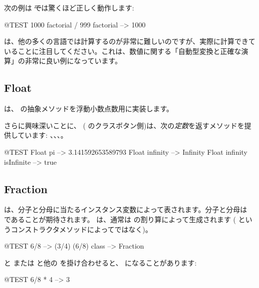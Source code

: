 \documentclass[a4paper,10pt,twoside]{book}
\begin{document}
次の例は \st では驚くほど正しく動作します:
\begin{code}{@TEST}
1000 factorial / 999 factorial --> 1000
\end{code}
 は、他の多くの言語では計算するのが非常に難しいのですが、実際に計算できていることに注目してください。これは、数値に関する「自動型変換と正確な演算」の非常に良い例になっています。


\subsection{Float}

 は、 の抽象メソッドを浮動小数点数用に実装します。

さらに興味深いことに、 (\ie{} のクラスボタン側)は、次の\emph{定数}を返すメソッドを提供しています: 、、、。

\begin{code}{@TEST}
Float pi                      --> 3.141592653589793
Float infinity               --> Infinity
Float infinity isInfinite --> true
\end{code}

\subsection{Fraction}

 は、分子と分母に当たるインスタンス変数によって表されます。分子と分母は  であることが期待されます。 は、通常は  の割り算によって生成されます ( というコンストラクタメソッドによってではなく)。

\begin{code}{@TEST}
6/8             --> (3/4)
(6/8) class --> Fraction
\end{code}

 と  または  と他の  を掛け合わせると、 になることがあります:

\begin{code}{@TEST}
6/8 * 4 --> 3
\end{code}
\end{document}
